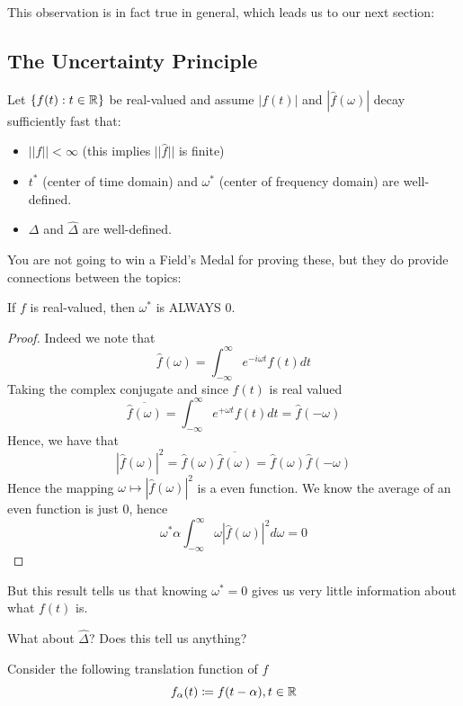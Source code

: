 \documentclass{article}
\begin{document}
This observation is in fact true in general, which leads us to our next section:

\subsection{The Uncertainty Principle}

Let $\{f(t) : t \in \mathbb{R}\}$ be real-valued and assume $|f(t)|$ and $|\hat{f}(\omega)|$ decay sufficiently fast that:
\begin{itemize}
    \item $||f|| < \infty$ (this implies $||\hat{f}||$ is finite)
    \item $t^*$ (center of time domain) and $\omega^*$ (center of frequency domain) are well-defined.
    \item $\Delta$ and $\hat{\Delta}$ are well-defined.
\end{itemize}

You are not going to win a Field's Medal for proving these, but they do provide connections between the topics:
\begin{proposition}
    If $f$ is real-valued, then $\omega^*$ is ALWAYS $0$.
\end{proposition}

\begin{proof}
        Indeed we note that
        \[\hat{f}(\omega) = \int_{-\infty}^\infty e^{-i\omega t} f(t) dt\]
        Taking the complex conjugate and since $f(t)$ is real valued
        \[\overline{\hat{f}(\omega)} = \int_{-\infty}^\infty e^{+\omega t} f(t) dt = \hat{f}(-\omega)\]
        Hence, we have that
        \[|\hat{f}(\omega)|^2 = \hat{f}(\omega) \overline{\hat{f}(\omega)} = \hat{f}(\omega) \hat{f}(-\omega)\]
        Hence the mapping $\omega \mapsto |\hat{f}(\omega)|^2$ is a even function. We know the average of an even function is just $0$, hence
        \[\omega^* \alpha \int_{-\infty}^\infty \omega |\hat{f}(\omega)|^2 d\omega = 0\]
\end{proof}

But this result tells us that knowing $\omega^* = 0$ gives us very little information about what $f(t)$ is.

\begin{question}
    What about $\hat{\Delta}$? Does this tell us anything?
\end{question}

Consider the following translation function of $f$
\[f_\alpha(t) \coloneqq f(t - \alpha), t \in \mathbb{R}\]
\end{document}
